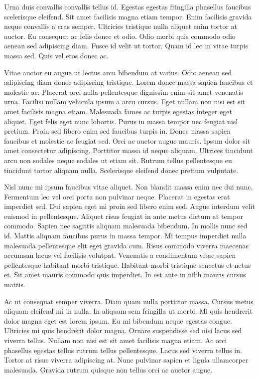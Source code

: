\documentclass[11pt,a4paper]{article}
\begin{document}
Urna duis convallis convallis tellus id. Egestas egestas fringilla phasellus faucibus scelerisque eleifend. Sit amet facilisis magna etiam tempor. Enim facilisis gravida neque convallis a cras semper. Ultricies tristique nulla aliquet enim tortor at auctor. Eu consequat ac felis donec et odio. Odio morbi quis commodo odio aenean sed adipiscing diam. Fusce id velit ut tortor. Quam id leo in vitae turpis massa sed. Quis vel eros donec ac.

Vitae auctor eu augue ut lectus arcu bibendum at varius. Odio aenean sed adipiscing diam donec adipiscing tristique. Lorem donec massa sapien faucibus et molestie ac. Placerat orci nulla pellentesque dignissim enim sit amet venenatis urna. Facilisi nullam vehicula ipsum a arcu cursus. Eget nullam non nisi est sit amet facilisis magna etiam. Malesuada fames ac turpis egestas integer eget aliquet. Eget felis eget nunc lobortis. Purus in massa tempor nec feugiat nisl pretium. Proin sed libero enim sed faucibus turpis in. Donec massa sapien faucibus et molestie ac feugiat sed. Orci ac auctor augue mauris. Ipsum dolor sit amet consectetur adipiscing. Porttitor massa id neque aliquam. Ultrices tincidunt arcu non sodales neque sodales ut etiam sit. Rutrum tellus pellentesque eu tincidunt tortor aliquam nulla. Scelerisque eleifend donec pretium vulputate.

Nisl nunc mi ipsum faucibus vitae aliquet. Non blandit massa enim nec dui nunc. Fermentum leo vel orci porta non pulvinar neque. Placerat in egestas erat imperdiet sed. Dui sapien eget mi proin sed libero enim sed. Augue interdum velit euismod in pellentesque. Aliquet risus feugiat in ante metus dictum at tempor commodo. Sapien nec sagittis aliquam malesuada bibendum. In mollis nunc sed id. Mattis aliquam faucibus purus in massa tempor. Mi tempus imperdiet nulla malesuada pellentesque elit eget gravida cum. Risus commodo viverra maecenas accumsan lacus vel facilisis volutpat. Venenatis a condimentum vitae sapien pellentesque habitant morbi tristique. Habitant morbi tristique senectus et netus et. Sit amet mauris commodo quis imperdiet. In est ante in nibh mauris cursus mattis.

Ac ut consequat semper viverra. Diam quam nulla porttitor massa. Cursus metus aliquam eleifend mi in nulla. In aliquam sem fringilla ut morbi. Mi quis hendrerit dolor magna eget est lorem ipsum. Eu mi bibendum neque egestas congue. Ultricies mi quis hendrerit dolor magna. Ornare suspendisse sed nisi lacus sed viverra tellus. Nullam non nisi est sit amet facilisis magna etiam. Ac orci phasellus egestas tellus rutrum tellus pellentesque. Lacus sed viverra tellus in. Tortor at risus viverra adipiscing at. Nunc pulvinar sapien et ligula ullamcorper malesuada. Gravida rutrum quisque non tellus orci ac auctor augue.
\end{document}
